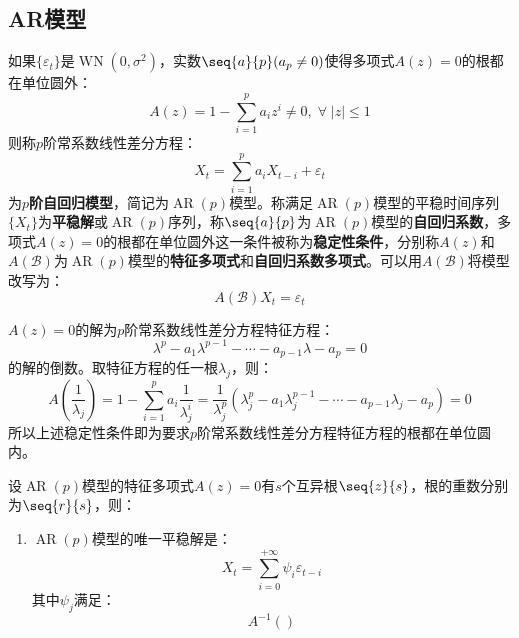 \subsection{AR模型}
\begin{definition}
	如果$\{\varepsilon_t\}$是$\operatorname{WN}(0,\sigma^2)$，实数$\seq{a}{p}(a_p\ne0)$使得多项式$A(z)=0$的根都在单位圆外：
	\begin{equation*}
		A(z)=1-\sum_{i=1}^{p}a_iz^i\ne0,\;\forall\;|z|\leqslant1
	\end{equation*}
	则称$p$阶常系数线性差分方程：
	\begin{equation*}
		X_t=\sum_{i=1}^{p}a_iX_{t-i}+\varepsilon_t
	\end{equation*}
	为$p$\textbf{阶自回归模型}，简记为$\operatorname{AR}(p)$模型。称满足$\operatorname{AR}(p)$模型的平稳时间序列$\{X_t\}$为\textbf{平稳解}或$\operatorname{AR}(p)$序列，称$\seq{a}{p}$为$\operatorname{AR}(p)$模型的\textbf{自回归系数}，多项式$A(z)=0$的根都在单位圆外这一条件被称为\textbf{稳定性条件}，分别称$A(z)$和$A(\mathcal{B})$为$\operatorname{AR}(p)$模型的\textbf{特征多项式}和\textbf{自回归系数多项式}。可以用$A(\mathcal{B})$将模型改写为：
	\begin{equation*}
		A(\mathcal{B})X_t=\varepsilon_t
	\end{equation*}
\end{definition}
\begin{derivation}
	$A(z)=0$的解为$p$阶常系数线性差分方程特征方程：
	\begin{equation*}
		\lambda^p-a_1\lambda^{p-1}-\cdots-a_{p-1}\lambda-a_p=0
	\end{equation*}
	的解的倒数。取特征方程的任一根$\lambda_j$，则：
	\begin{equation*}
		A\left(\frac{1}{\lambda_j}\right)=1-\sum_{i=1}^{p}a_i\frac{1}{\lambda_j^i}=\frac{1}{\lambda_j^p}(\lambda_j^p-a_1\lambda_j^{p-1}-\cdots-a_{p-1}\lambda_j-a_{p})=0
	\end{equation*}
	所以上述稳定性条件即为要求$p$阶常系数线性差分方程特征方程的根都在单位圆内。
\end{derivation}
\begin{theorem}
	设$\operatorname{AR}(p)$模型的特征多项式$A(z)=0$有$s$个互异根$\seq{z}{s}$，根的重数分别为$\seq{r}{s}$，则：
	\begin{enumerate}
		\item $\operatorname{AR}(p)$模型的唯一平稳解是：
		\begin{equation*}
			X_t=\sum_{i=0}^{+\infty}\psi_i\varepsilon_{t-i}
		\end{equation*}
		其中$\psi_j$满足：
		\begin{equation*}
			A^{-1}()
		\end{equation*}
	\end{enumerate}
\end{theorem}

